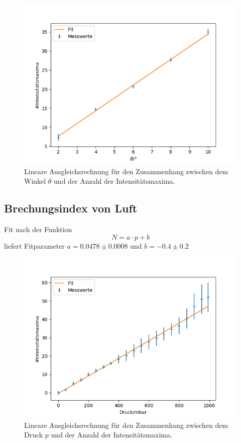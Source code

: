 \begin{figure}[h]
\centering
\includegraphics[width=\linewidth]{img/n_glas.png}
\caption{Lineare Ausgleichsrechnung für den Zusammenhang zwischen dem Winkel $\theta$ und der Anzahl
der Intensitätsmaxima.}
\label{n_glas}
\end{figure}

\subsection{Brechungsindex von Luft}

Fit nach der Funktion
\[
N = a \cdot p + b
\]
liefert Fitparameter $a = 0.0478 \pm 0.0008$ und $b = -0.4 \pm 0.2$

\begin{figure}[h]
\centering
\includegraphics[width=\linewidth]{img/n_luft.png}
\caption{Lineare Ausgleichsrechnung für den Zusammenhang zwischen dem Druck $p$ und der Anzahl
der Intensitätsmaxima.}
\label{n_luft}
\end{figure}
